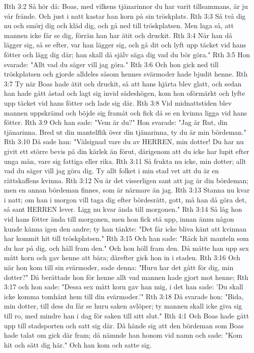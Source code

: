 Rth 3:2  Så hör då: Boas, med vilkens tjänarinnor du har varit tillsammans, är ju vår frände. Och just i natt kastar han korn på sin tröskplats.
Rth 3:3  Så två dig nu och smörj dig och kläd dig, och gå ned till tröskplatsen. Men laga så, att mannen icke får se dig, förrän han har ätit och druckit.
Rth 3:4  När han då lägger sig, så se efter, var han lägger sig, och gå dit och lyft upp täcket vid hans fötter och lägg dig där; han skall då själv säga dig vad du bör göra."
Rth 3:5  Hon svarade: "Allt vad du säger vill jag göra."
Rth 3:6  Och hon gick ned till tröskplatsen och gjorde alldeles såsom hennes svärmoder hade bjudit henne.
Rth 3:7  Ty när Boas hade ätit och druckit, så att hans hjärta blev glatt, och sedan han hade gått åstad och lagt sig invid sädeshögen, kom hon oförmärkt och lyfte upp täcket vid hans fötter och lade sig där.
Rth 3:8  Vid midnattstiden blev mannen uppskrämd och böjde sig framåt och fick då se en kvinna ligga vid hans fötter.
Rth 3:9  Och han sade: "Vem är du?" Hon svarade: "Jag är Rut, din tjänarinna. Bred ut din mantelflik över din tjänarinna, ty du är min bördeman."
Rth 3:10  Då sade han: "Välsignad vare du av HERREN, min dotter! Du har nu givit ett större bevis på din kärlek än förut, därigenom att du icke har lupit efter unga män, vare sig fattiga eller rika.
Rth 3:11  Så frukta nu icke, min dotter; allt vad du säger vill jag göra dig. Ty allt folket i min stad vet att du är en rättskaffens kvinna.
Rth 3:12  Nu är det visserligen sant att jag är din bördeman; men en annan bördeman finnes, som är närmare än jag.
Rth 3:13  Stanna nu kvar i natt; om han i morgon vill taga dig efter bördesrätt, gott, må han då göra det, så sant HERREN lever. Ligg nu kvar ända till morgonen."
Rth 3:14  Så låg hon vid hans fötter ända till morgonen, men hon fick stå upp, innan ännu någon kunde känna igen den andre; ty han tänkte: "Det får icke bliva känt att kvinnan har kommit hit till tröskplatsen."
Rth 3:15  Och han sade: "Räck hit manteln som du har på dig, och håll fram den." Och hon höll fram den. Då mätte han upp sex mått korn och gav henne att bära; därefter gick hon in i staden.
Rth 3:16  Och när hon kom till sin svärmoder, sade denna: "Huru har det gått för dig, min dotter?" Då berättade hon för henne allt vad mannen hade gjort mot henne;
Rth 3:17  och hon sade: "Dessa sex mått korn gav han mig, i det han sade: 'Du skall icke komma tomhänt hem till din svärmoder.'"
Rth 3:18  Då svarade hon: "Bida, min dotter, till dess du får se huru saken avlöper; ty mannen skall icke giva sig till ro, med mindre han i dag för saken till sitt slut."
Rth 4:1  Och Boas hade gått upp till stadsporten och satt sig där. Då hände sig att den bördeman som Boas hade talat om gick där fram; då nämnde han honom vid namn och sade: "Kom hit och sätt dig här." Och han kom och satte sig.
